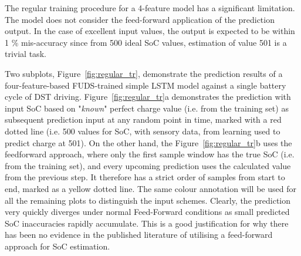 The regular training procedure for a 4-feature model has a significant limitation. The model does not consider the feed-forward application of the prediction output.
In the case of excellent input values, the output is expected to be within 1 \% mis-accuracy since from 500 ideal SoC values, estimation of value 501 is a trivial task.

%
%
Two subplots, \mbox{Figure~\ref{fig:regular_tr}}, demonstrate the prediction results of a four-feature-based FUDS-trained simple LSTM model against a single battery cycle of DST driving.
\mbox{Figure~\ref{fig:regular_tr}a} demonstrates the prediction with input SoC based on "\textit{known}" perfect charge value (i.e. from the training set) as subsequent prediction input at any random point in time, marked with a red dotted line (i.e. 500 values for SoC, with sensory data, from learning used to predict charge at 501).
On the other hand, the \mbox{Figure~\ref{fig:regular_tr}b} uses the feedforward approach, where only the first sample window has the true SoC (i.e. from the training set), and every upcoming prediction uses the calculated value from the previous step.
It therefore has a strict order of samples from start to end, marked as a yellow dotted line.
The same colour annotation will be used for all the remaining plots to distinguish the input schemes.
Clearly, the prediction very quickly diverges under normal Feed-Forward conditions as small predicted SoC inaccuracies rapidly accumulate. %
This is a good justification for why there has been no evidence in the published literature of utilising a feed-forward approach for SoC estimation.
